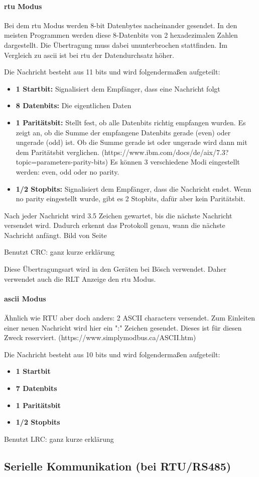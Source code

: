 \paragraph{\acs{rtu} Modus}
Bei dem \acs{rtu} Modus werden 8-bit Datenbytes nacheinander gesendet. In den meisten Programmen werden diese 8-Datenbits von 2 hexadezimalen Zahlen dargestellt. Die Übertragung muss dabei ununterbrochen stattfinden. Im Vergleich zu \acs{ascii} ist bei \acs{rtu} der Datendurchsatz höher. 

Die Nachricht besteht aus 11 bits und wird folgendermaßen aufgeteilt:
\begin{itemize}
	\item \textbf{1 Startbit:} Signalisiert dem Empfänger, dass eine Nachricht folgt
	\item \textbf{8 Datenbits:} Die eigentlichen Daten
	\item \textbf{1 Paritätsbit:} Stellt fest, ob alle Datenbits richtig empfangen wurden. Es zeigt an, ob die Summe der empfangene Datenbits gerade (even) oder ungerade (odd) ist. Ob die Summe gerade ist oder ungerade wird dann mit dem Paritätsbit verglichen.   (https://www.ibm.com/docs/de/aix/7.3?topic=parameters-parity-bits) Es können 3 verschiedene Modi eingestellt werden: even, odd oder no parity.
	\item \textbf{1/2 Stopbits:} Signalisiert dem Empfänger, dass die Nachricht endet. Wenn no parity eingestellt wurde, gibt es 2 Stopbits, dafür aber kein Paritätsbit.
\end{itemize}

Nach jeder Nachricht wird 3.5 Zeichen gewartet, bis die nächste Nachricht versendet wird. Dadurch
erkennt das Protokoll genau, wann die nächste Nachricht anfängt. 
Bild von Seite

Benutzt CRC: ganz kurze erklärung

Diese Übertragungsart wird in den Geräten bei Bösch verwendet. Daher verwendet auch die RLT Anzeige den \acs{rtu} Modus.

\paragraph{\acs{ascii} Modus}
Ähnlich wie RTU aber doch anders: 2 ASCII characters versendet.
Zum Einleiten einer neuen Nachricht wird hier ein ":" Zeichen gesendet. Dieses ist für diesen Zweck reserviert.
(https://www.simplymodbus.ca/ASCII.htm)

Die Nachricht besteht aus 10 bits und wird folgendermaßen aufgeteilt:
\begin{itemize}
	\item \textbf{1 Startbit}
	\item \textbf{7 Datenbits}
	\item \textbf{1 Paritätsbit}
	\item \textbf{1/2 Stopbits}
\end{itemize}

Benutzt LRC: ganz kurze erklärung

\subsection{Serielle Kommunikation (bei RTU/RS485)}


